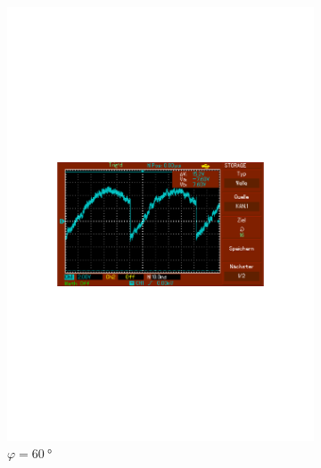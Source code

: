 \begin{figure}
\begin{subfigure}{0.3\textwidth}
      \includegraphics[width=\textwidth]{Daten/Noise/60.pdf}
      \caption{$\varphi = \SI{60}{\degree}$}
      \label{fig:60n}
  \end{subfigure}
  \par\medskip %
  \begin{subfigure}{0.3\textwidth}
      \centering

\end{subfigure}
\end{figure}
